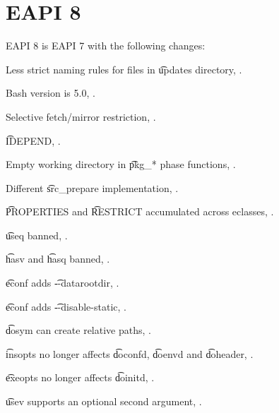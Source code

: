 \section{EAPI 8}

EAPI 8 is EAPI 7 with the following changes:

\begin{compactitem}
\item Less strict naming rules for files in \t{updates} directory, .
\item Bash version is 5.0, .
\item Selective fetch/mirror restriction, .
\item \t{IDEPEND}, .
\item Empty working directory in \t{pkg_*} phase functions, .
\item Different \t{src_prepare} implementation, .
\item \t{PROPERTIES} and \t{RESTRICT} accumulated across eclasses, .
\item \t{useq} banned, .
\item \t{hasv} and \t{hasq} banned, .
\item \t{econf} adds \t{-{}-datarootdir}, .
\item \t{econf} adds \t{-{}-disable-static}, .
\item \t{dosym} can create relative paths, .
\item \t{insopts} no longer affects \t{doconfd}, \t{doenvd} and \t{doheader}, .
\item \t{exeopts} no longer affects \t{doinitd}, .
\item \t{usev} supports an optional second argument, .
\end{compactitem}



